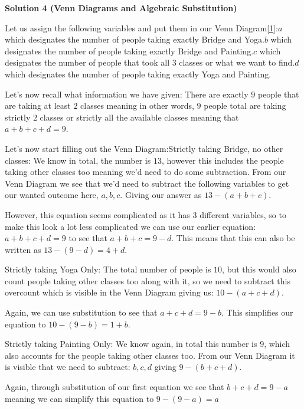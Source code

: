 \begin{enumerate}
 



\textbf{Solution 4 (Venn Diagrams and Algebraic Substitution)}

Let us assign the following variables and put them in our Venn Diagram\href{https://artofproblemsolving.com/wiki/index.php/File:IMG\_20220704\_192122676\_2.jpg\#filelinks}{[1]}:$a$ which designates the number of people taking exactly Bridge and Yoga.$b$ which designates the number of people taking exactly Bridge and Painting.$c$ which designates the number of people that took all $3$ classes or what we want to find.$d$ which designates the number of people taking exactly Yoga and Painting.

 Let's now recall what information we have given: There are exactly $9$ people that are taking at least $2$ classes meaning in other words, $9$ people total are taking strictly $2$ classes or strictly all the available classes meaning that $a+b+c+d=9$.

 Let's now start filling out the Venn Diagram:Strictly taking Bridge, no other classes: We know in total, the number is $13$, however this includes the people taking other classes too meaning we'd need to do some subtraction. From our Venn Diagram we see that we'd need to subtract the following variables to get our wanted outcome here, $a, b, c$. Giving our answer as $13-(a+b+c)$. 

 However, this equation seems complicated as it has $3$ different variables, so to make this look a lot less complicated we can use our earlier equation: $a+b+c+d=9$ to see that $a+b+c=9-d$. This means that this can also be written as $13-(9-d)=4+d$.

 
Strictly taking Yoga Only: The total number of people is $10$, but this would also count people taking other classes too along with it, so we need to subtract this overcount which is visible in the Venn Diagram giving us: $10-(a+c+d)$.

 Again, we can use substitution to see that $a+c+d=9-b$. This simplifies our equation to $10-(9-b)=1+b$.

 Strictly taking Painting Only: We know again, in total this number is $9$, which also accounts for the people taking other classes too. From our Venn Diagram it is visible that we need to subtract: $b, c, d$ giving $9-(b+c+d)$.

 Again, through substitution of our first equation we see that $b+c+d=9-a$ meaning we can simplify this equation to $9-(9-a)=a$


\end{enumerate}
